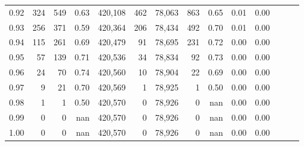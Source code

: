 \begin{tabular}{rrrrrrrrrrrrrr}
0.92 &    324 &    549 &  0.63 &  420,108 &      462 &  78,063 &     863 &  0.65 &  0.01 &      0.00 \\
0.93 &    256 &    371 &  0.59 &  420,364 &      206 &  78,434 &     492 &  0.70 &  0.01 &      0.00 \\
0.94 &    115 &    261 &  0.69 &  420,479 &       91 &  78,695 &     231 &  0.72 &  0.00 &      0.00 \\
0.95 &     57 &    139 &  0.71 &  420,536 &       34 &  78,834 &      92 &  0.73 &  0.00 &      0.00 \\
0.96 &     24 &     70 &  0.74 &  420,560 &       10 &  78,904 &      22 &  0.69 &  0.00 &      0.00 \\
0.97 &      9 &     21 &  0.70 &  420,569 &        1 &  78,925 &       1 &  0.50 &  0.00 &      0.00 \\
0.98 &      1 &      1 &  0.50 &  420,570 &        0 &  78,926 &       0 &   nan &  0.00 &      0.00 \\
0.99 &      0 &      0 &   nan &  420,570 &        0 &  78,926 &       0 &   nan &  0.00 &      0.00 \\
1.00 &      0 &      0 &   nan &  420,570 &        0 &  78,926 &       0 &   nan &  0.00 &      0.00 \\
\bottomrule
\end{tabular}
